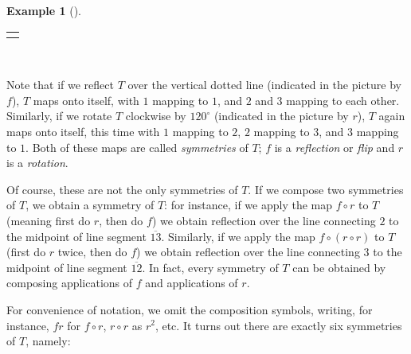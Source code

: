 \documentclass[10pt,]{book}
\theoremstyle{plain}
\theoremstyle{definition}
\theoremstyle{definition}
\theoremstyle{definition}
\newtheorem{example}[theorem]{Example}
\theoremstyle{definition}
\numberwithin{equation}{section}
\newlength{\panelmax}
\begin{document}
\begin{example}[]
{\begin{lrbox}{\panelboxFimage}
{{
}
}\end{lrbox}
\newlength{\phFimage}\setlength{\phFimage}{\ht\panelboxFimage+\dp\panelboxFimage}
\settototalheight{\phFimage}{\usebox{\panelboxFimage}}
\setlength{\panelmax}{\maxof{\panelmax}{\phFimage}}
\leavevmode%
\setlength{\tabcolsep}{0\linewidth}
\par\medskip\noindent
\hspace*{0.35\linewidth}%
\begin{tabular}{@{}*{1}{c}@{}}
\begin{minipage}[c][\panelmax][t]{0.3\linewidth}\usebox{\panelboxFimage}\end{minipage}\end{tabular}\\
}%
\par
Note that if we reflect \(T\) over the vertical dotted line (indicated in the picture by \(f\)), \(T\) maps onto itself, with \(1\) mapping to \(1\), and \(2\) and \(3\) mapping to each other. Similarly, if we rotate \(T\) clockwise by \(120^{\circ}\) (indicated in the picture by \(r\)), \(T\) again maps onto itself, this time with \(1\) mapping to \(2\), \(2\) mapping to \(3\), and \(3\) mapping to \(1\). Both of these maps are called \emph{symmetries} of \(T\); \(f\) is a \emph{reflection} or \emph{flip} and \(r\) is a \emph{rotation}.%
\par
Of course, these are not the only symmetries of \(T\). If we compose two symmetries of \(T\), we obtain a symmetry of \(T\): for instance, if we apply the map \(f\circ r\) to \(T\) (meaning first do \(r\), then do \(f\)) we obtain reflection over the line connecting \(2\) to the midpoint of line segment \(\overline{13}\). Similarly, if we apply the map \(f\circ (r\circ r)\) to \(T\) (first do \(r\) twice, then do \(f\)) we obtain reflection over the line connecting \(3\) to the midpoint of line segment \(\overline{12}\). In fact, every symmetry of \(T\) can be obtained by composing applications of \(f\) and applications of \(r\).%
\par
For convenience of notation, we omit the composition symbols, writing, for instance, \(fr\) for \(f\circ r\), \(r\circ r\) as \(r^2\), etc. It turns out there are exactly six symmetries of \(T\), namely: \leavevmode%

\end{example}
\end{document}
